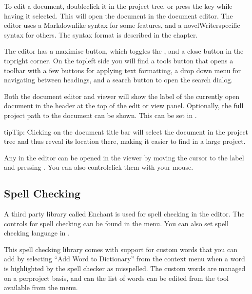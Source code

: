 \documentclass[a4paper,11pt,english]{sphinxmanual}
\begin{document}
\sphinxAtStartPar
To edit a document, double\sphinxhyphen{}click it in the project tree, or press the  key while
having it selected. This will open the document in the document editor. The editor uses a
Markdown\sphinxhyphen{}like syntax for some features, and a novelWriter\sphinxhyphen{}specific syntax for others. The syntax
format is described in the {\hyperref[\detokenize{usage_format:a-fmt}]{}} chapter.

\sphinxAtStartPar
The editor has a maximise button, which toggles the , and a close button in the
top\textendash{}right corner. On the top\textendash{}left side you will find a tools button that opens a toolbar with a
few buttons for applying text formatting, a drop down menu for navigating between headings, and a
search button to open the search dialog.

\sphinxAtStartPar
Both the document editor and viewer will show the label of the currently open document in the
header at the top of the edit or view panel. Optionally, the full project path to the document can
be shown. This can be set in .

\begin{sphinxadmonition}{tip}{Tip:}
\sphinxAtStartPar
Clicking on the document title bar will select the document in the project tree and thus reveal
its location there, making it easier to find in a large project.
\end{sphinxadmonition}

\sphinxAtStartPar
Any {\hyperref[\detokenize{int_glossary:term-Reference}]{}} in the editor can be opened in the viewer by moving the cursor to
the label and pressing . You can also control\sphinxhyphen{}click them with your mouse.


\subsection{Spell Checking}
\label{\detokenize{usage_writing:spell-checking}}
\sphinxAtStartPar
A third party library called Enchant is used for spell checking in the editor. The controls for
spell checking can be found in the  menu. You can also set spell checking language in
.

\sphinxAtStartPar
This spell checking library comes with support for custom words that you can add by selecting
“Add Word to Dictionary” from the context menu when a word is highlighted by the spell checker as
misspelled. The custom words are managed on a per\sphinxhyphen{}project basis, and can the list of words can be
edited from the  tool available from the  menu.
\end{document}
